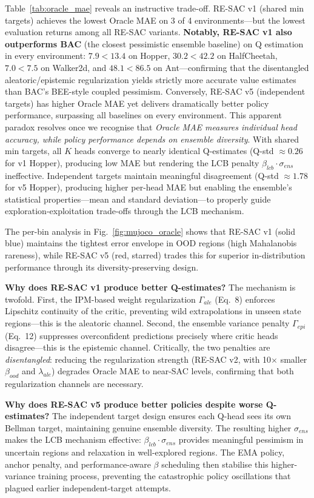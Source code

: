 \documentclass[10pt]{article}
\begin{document}
Table~\ref{tab:oracle_mae} reveals an instructive trade-off. RE-SAC v1 (shared min targets) achieves the lowest Oracle MAE on 3 of 4 environments---but the lowest evaluation returns among all RE-SAC variants. \textbf{Notably, RE-SAC v1 also outperforms BAC} (the closest pessimistic ensemble baseline) on Q estimation in every environment: $7.9{<}13.4$ on Hopper, $30.2{<}42.2$ on HalfCheetah, $7.0{<}7.5$ on Walker2d, and $48.1{<}86.5$ on Ant—confirming that the disentangled aleatoric/epistemic regularization yields strictly more accurate value estimates than BAC's BEE-style coupled pessimism. Conversely, RE-SAC v5 (independent targets) has higher Oracle MAE yet delivers dramatically better policy performance, surpassing all baselines on every environment. This apparent paradox resolves once we recognise that \emph{Oracle MAE measures individual head accuracy, while policy performance depends on ensemble diversity}. With shared min targets, all $K$ heads converge to nearly identical Q-estimates (Q-std $\approx 0.26$ for v1 Hopper), producing low MAE but rendering the LCB penalty $\beta_{lcb} \cdot \sigma_{ens}$ ineffective. Independent targets maintain meaningful disagreement (Q-std $\approx 1.78$ for v5 Hopper), producing higher per-head MAE but enabling the ensemble's statistical properties---mean and standard deviation---to properly guide exploration-exploitation trade-offs through the LCB mechanism.

The per-bin analysis in Fig.~\ref{fig:mujoco_oracle} shows that RE-SAC v1 (solid blue) maintains the tightest error envelope in OOD regions (high Mahalanobis rareness), while RE-SAC v5 (red, starred) trades this for superior in-distribution performance through its diversity-preserving design.

\textbf{Why does RE-SAC v1 produce better Q-estimates?} The mechanism is twofold. First, the IPM-based weight regularization $\Gamma_{ale}$ (Eq.~8) enforces Lipschitz continuity of the critic, preventing wild extrapolations in unseen state regions---this is the aleatoric channel. Second, the ensemble variance penalty $\Gamma_{epi}$ (Eq.~12) suppresses overconfident predictions precisely where critic heads disagree---this is the epistemic channel. Critically, the two penalties are \emph{disentangled}: reducing the regularization strength (RE-SAC v2, with 10$\times$ smaller $\beta_{ood}$ and $\lambda_{ale}$) degrades Oracle MAE to near-SAC levels, confirming that both regularization channels are necessary.

\textbf{Why does RE-SAC v5 produce better policies despite worse Q-estimates?} The independent target design ensures each Q-head sees its own Bellman target, maintaining genuine ensemble diversity. The resulting higher $\sigma_{ens}$ makes the LCB mechanism effective: $\beta_{lcb} \cdot \sigma_{ens}$ provides meaningful pessimism in uncertain regions and relaxation in well-explored regions. The EMA policy, anchor penalty, and performance-aware $\beta$ scheduling then stabilise this higher-variance training process, preventing the catastrophic policy oscillations that plagued earlier independent-target attempts.
\end{document}
